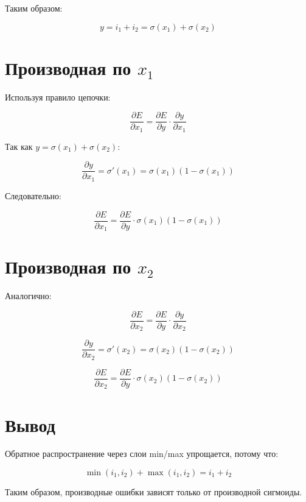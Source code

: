 \documentclass[a4paper,12pt]{article}
\begin{document}
Таким образом:

\[
y = i_1 + i_2 = \sigma(x_1) + \sigma(x_2)
\]

\section*{Производная по $x_1$}

Используя правило цепочки:

\[
\frac{\partial E}{\partial x_1} = \frac{\partial E}{\partial y} \cdot \frac{\partial y}{\partial x_1}
\]

Так как $y = \sigma(x_1) + \sigma(x_2)$:

\[
\frac{\partial y}{\partial x_1} = \sigma'(x_1) = \sigma(x_1)(1 - \sigma(x_1))
\]

Следовательно:

\[
\boxed{\frac{\partial E}{\partial x_1} = \frac{\partial E}{\partial y} \cdot \sigma(x_1)(1 - \sigma(x_1))}
\]

\section*{Производная по $x_2$}

Аналогично:

\[
\frac{\partial E}{\partial x_2} = \frac{\partial E}{\partial y} \cdot \frac{\partial y}{\partial x_2}
\]

\[
\frac{\partial y}{\partial x_2} = \sigma'(x_2) = \sigma(x_2)(1 - \sigma(x_2))
\]

\[
\boxed{\frac{\partial E}{\partial x_2} = \frac{\partial E}{\partial y} \cdot \sigma(x_2)(1 - \sigma(x_2))}
\]

\section*{Вывод}

Обратное распространение через слои min/max упрощается, потому что:

\[
\min(i_1,i_2) + \max(i_1,i_2) = i_1 + i_2
\]

Таким образом, производные ошибки зависят только от производной сигмоиды.
\end{document}
